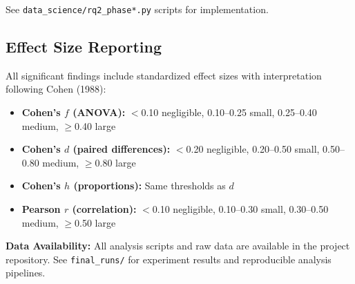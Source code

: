 See \texttt{data\_science/rq2\_phase*.py} scripts for implementation.

\subsection{Effect Size Reporting}

All significant findings include standardized effect sizes with interpretation following Cohen (1988):
\begin{itemize}[noitemsep]
    \item \textbf{Cohen's $f$ (ANOVA):} $<$0.10 negligible, 0.10--0.25 small, 0.25--0.40 medium, $\geq$0.40 large
    \item \textbf{Cohen's $d$ (paired differences):} $<$0.20 negligible, 0.20--0.50 small, 0.50--0.80 medium, $\geq$0.80 large
    \item \textbf{Cohen's $h$ (proportions):} Same thresholds as $d$
    \item \textbf{Pearson $r$ (correlation):} $<$0.10 negligible, 0.10--0.30 small, 0.30--0.50 medium, $\geq$0.50 large
\end{itemize}

\textbf{Data Availability:} All analysis scripts and raw data are available in the project repository. See \texttt{final\_runs/} for experiment results and reproducible analysis pipelines.

